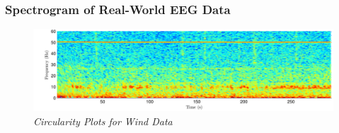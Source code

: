 \documentclass[./main.tex]{subfiles}
\begin{document}
\subsubsection{Spectrogram of Real-World EEG Data}

\begin{figure}[h]
	\centering 
	\includegraphics[scale=0.8]{fig/2/2_3_b.pdf}
	\caption{\textit{Circularity Plots for Wind Data}}
	\label{fig:}
\end{figure}
\end{document}
